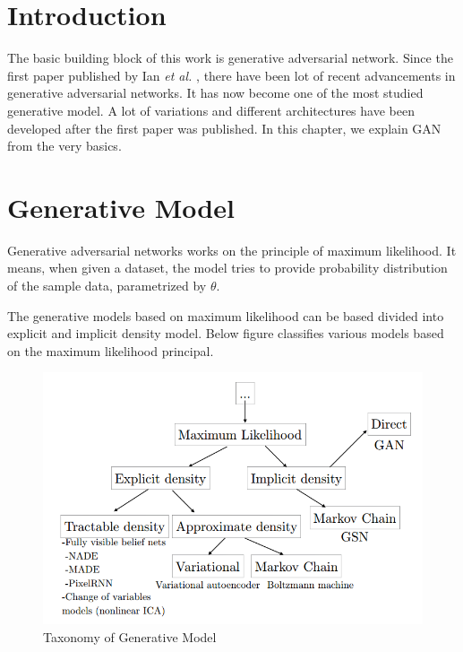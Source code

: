 

\section{Introduction}

The basic building block of this work is generative adversarial network. Since the first paper published by Ian \textit{et al.} \cite{Original-GAN} , there have been lot of recent advancements in generative adversarial networks. It has now become one of the most studied generative model. A lot of variations and different architectures have been developed after the first paper was published. In this chapter, we explain GAN from the very basics.

\section{Generative Model}
Generative adversarial networks works on the principle of maximum likelihood.
It means, when given a dataset, the model tries to provide probability distribution of the sample data, parametrized by $\theta$. %
\par
The generative models based on maximum likelihood can be based divided into explicit and implicit density model. Below figure classifies various models based on the maximum likelihood principal.
%
\begin{figure}[ht]
    
    \includegraphics[scale=.6, angle=0]{Files/taxanomy.png}
    \caption[The panther]{Taxonomy of Generative Model\cite{GanTut}}
    \label{fig: jordan}
\end{figure}

